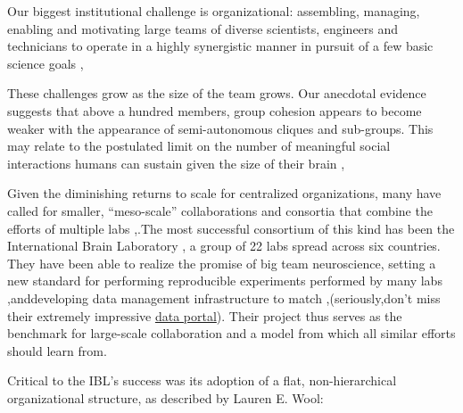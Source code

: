 \documentclass{article}
\begin{document}
\begin{leftbar}
Our biggest institutional challenge is organizational: assembling,
managing, enabling and motivating large teams of diverse scientists,
engineers and technicians to operate in a highly synergistic manner in
pursuit of a few basic science goals \cite{grillnerWorldwideInitiativesAdvance2016},\end{leftbar}
\begin{leftbar}
These challenges grow as the size of the team grows. Our anecdotal
evidence suggests that above a hundred members, group cohesion appears
to become weaker with the appearance of semi-autonomous cliques and
sub-groups. This may relate to the postulated limit on the number of
meaningful social interactions humans can sustain given the size of
their brain \cite{kochBigScienceTeam2016},\end{leftbar}
Given the diminishing returns to scale for centralized organizations,
many have called for smaller, ``meso-scale'' collaborations and
consortia that combine the efforts of multiple labs \cite{mainenBetterWayCrack2016},.The most successful consortium of this
kind has been the International Brain Laboratory \cite{
abbottInternationalLaboratorySystems2017, woolKnowledgeNetworksHow2020a}, a group of 22 labs spread across six countries. They have been
able to realize the promise of big team neuroscience, setting a new
standard for performing reproducible experiments performed by many labs
\cite{laboratoryStandardizedReproducibleMeasurement2020},anddeveloping data management infrastructure to match \cite{laboratoryDataArchitectureLargescale2020},(seriously,don't miss
their extremely impressive
\href{https://data.internationalbrainlab.org/}{data portal}). Their
project thus serves as the benchmark for large-scale collaboration and a
model from which all similar efforts should learn from.

Critical to the IBL's success was its adoption of a flat,
non-hierarchical organizational structure, as described by Lauren E.
Wool:
\end{document}

